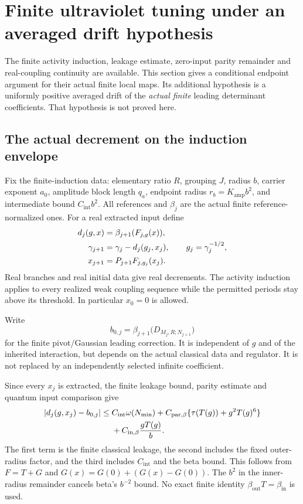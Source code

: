 \section{Finite ultraviolet tuning under an averaged drift hypothesis}
\label{fts-section}

The finite activity induction, leakage estimate, zero-input
parity remainder and real-coupling continuity are available.
This section gives a conditional endpoint argument for their
actual finite local maps. Its additional hypothesis is a
uniformly positive averaged drift of the \emph{actual finite}
leading determinant coefficients. That hypothesis is not
proved here.

\subsection{The actual decrement on the induction envelope}
\label{fts-decrement-section}

Fix the finite-induction data: elementary ratio $R$, grouping
$J$, radius $b$, carrier exponent $a_0$, amplitude block length
$q_a$, endpoint radius $r_b=K_{\mathrm{amp}}b^2$, and intermediate
bound $C_{\mathrm{int}}b^2$. All references and $\beta_j$ are the
actual finite reference-normalized ones. For a real extracted
input define
\begin{align}
 d_j(g,x)&=\beta_{j+1}(F_{j,g}(x)),\notag\\
 \gamma_{j+1}&=\gamma_j-d_j(g_j,x_j),\qquad
 g_j=\gamma_j^{-1/2},\notag\\
 x_{j+1}&=P_{j+1}F_{j,g_j}(x_j).
 \label{fts-actual-update}
\end{align}
Real branches and real initial data give real decrements.
The activity induction applies to every realized weak
coupling sequence while the permitted periods stay above
its threshold. In particular $x_0=0$ is allowed.

Write
\begin{equation}
 b_{0,j}=\beta_{j+1}
       \bigl(D_{M_j,R;N_{j+1}}\bigr)
 \label{fts-leading-coefficient}
\end{equation}
for the finite pivot/Gaussian leading correction. It is
independent of $g$ and of the inherited interaction, but
depends on the actual classical data and regulator. It is
not replaced by an independently selected infinite coefficient.

Since every $x_j$ is extracted, the finite leakage bound,
parity estimate and quantum input comparison give
\begin{align}
 |d_j(g,x_j)-b_{0,j}|
 \leq{}& C_{\mathrm{int}}\omega(N_{\min})
   +C_{\mathrm{par},\beta}
       \{\tau(T(g))+g^2T(g)^6\}\notag\\
 &+C_{\mathrm{in},\beta}\frac{gT(g)}b .
 \label{fts-decrement-error}
\end{align}
The first term is the finite classical leakage, the second
includes the fixed outer-radius factor, and the third includes
$C_{\mathrm{int}}$ and the beta bound. This follows from
$F=T+G$ and $G(x)=G(0)+(G(x)-G(0))$. The $b^2$ in the
inner-radius remainder cancels beta's $b^{-2}$ bound.
No exact finite identity $\beta_{\mathrm{out}}T
=\beta_{\mathrm{in}}$ is used.

